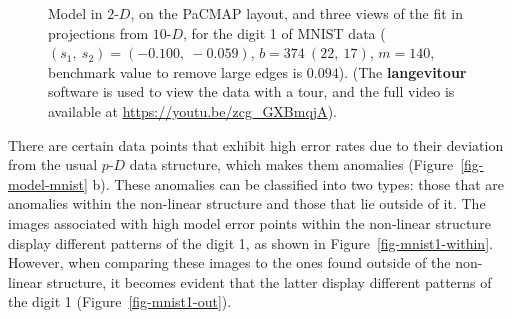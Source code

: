 \documentclass[
  12pt]{article}
\newcommand\pD{$p\text{-}D$}
\newcommand\gD{$2\text{-}D$}
\begin{document}
\begin{figure}[H]
\begin{minipage}{0.25\linewidth}
{}

\subcaption{\label{fig-mnist1-sc3}}

\end{minipage}%

\caption{\label{fig-mnist1-sc}Model in \gD{}, on the PaCMAP layout, and
three views of the fit in projections from \(10\text{-}D\), for the
digit 1 of MNIST data (\((s_1, \ s_2) = (-0.100, \ -0.059)\),
\(b = 374 \  (22, \ 17)\), \(m = 140\), benchmark value to remove large
edges is \(0.094\)). (The \textbf{langevitour} software is used to view
the data with a tour, and the full video is available at
\url{https://youtu.be/zcg_GXBmqjA}).}

\end{figure}%

There are certain data points that exhibit high error rates due to their
deviation from the usual \pD{} data structure, which makes them
anomalies (Figure~\ref{fig-model-mnist} b). These anomalies can be
classified into two types: those that are anomalies within the
non-linear structure and those that lie outside of it. The images
associated with high model error points within the non-linear structure
display different patterns of the digit 1, as shown in
Figure~\ref{fig-mnist1-within}. However, when comparing these images to
the ones found outside of the non-linear structure, it becomes evident
that the latter display different patterns of the digit 1
(Figure~\ref{fig-mnist1-out}).
\end{document}
